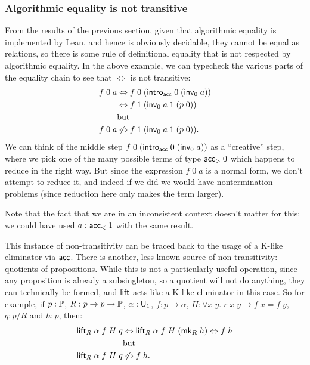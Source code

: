 \subsubsection{Algorithmic equality is not transitive}
From the results of the previous section, given that algorithmic equality is implemented by Lean, and hence is obviously decidable, they cannot be equal as relations, so there is some rule of definitional equality that is not respected by algorithmic equality. In the above example, we can typecheck the various parts of the equality chain to see that $\Leftrightarrow$ is not transitive:
\begin{align*}
f\;0\;a&\Leftrightarrow f\;0\;(\intro_\acc\;0\;(\inv_0\;a))\\
&\Leftrightarrow f\;1\;(\inv_0\;a\;1\;(p\;0))\\
&\mbox{but}\\
f\;0\;a&\not\Leftrightarrow f\;1\;(\inv_0\;a\;1\;(p\;0)).
\end{align*}
We can think of the middle step $f\;0\;(\intro_\acc\;0\;(\inv_0\;a))$ as a ``creative'' step, where we pick one of the many possible terms of type $\acc_{>}\;0$ which happens to reduce in the right way. But since the expression $f\;0\;a$ is a normal form, we don't attempt to reduce it, and indeed if we did we would have nontermination problems (since reduction here only makes the term larger).

Note that the fact that we are in an inconsistent context doesn't matter for this: we could have used $a:\acc_{<}\;1$ with the same result.

This instance of non-transitivity can be traced back to the usage of a K-like eliminator via $\acc$. There is another, less known source of non-transitivity: quotients of propositions. While this is not a particularly useful operation, since any proposition is already a subsingleton, so a quotient will not do anything, they can technically be formed, and $\lift$ acts like a K-like eliminator in this case. So for example, if $p:\P$, $R:p\to p\to\P$, $\alpha:\U_1$, $f:p\to\alpha$, $H:\forall x\;y.\;r\;x\;y\to f\;x= f\;y$, $q:p/R$ and $h:p$, then:
\begin{align*}
\lift_R\;\alpha\;f\;H\;q&\Leftrightarrow \lift_R\;\alpha\;f\;H\;(\mk_R\;h)\Leftrightarrow f\;h\\
&\mbox{but}\\
\lift_R\;\alpha\;f\;H\;q&\not\Leftrightarrow f\;h.
\end{align*}


